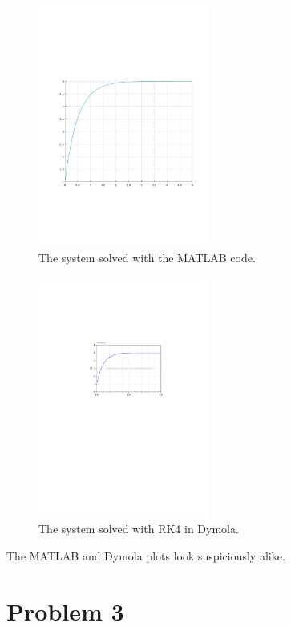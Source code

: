 \documentclass{article}
\begin{document}
\begin{figure}[!ht]
    \centering
    \includegraphics[width = 0.5\textwidth]{ex2_2_RK4_plot}
    \caption{The system solved with the MATLAB code.}
    \label{fig:RK4MATLAB} 
\end{figure}

\begin{figure}[!ht]
    \centering
    \includegraphics[width = 0.5\textwidth]{ex2_2d}
    \caption{The system solved with RK4 in Dymola.}
    \label{fig:RK4Dymola} 
\end{figure}

The MATLAB and Dymola plots look suspiciously alike.

\section{Problem 3}
\end{document}
